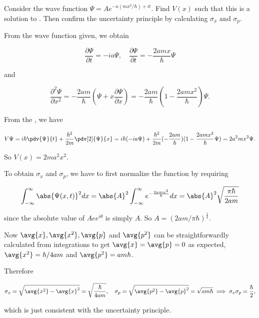 \documentclass[a4paper,12pt]{report}
\begin{document}
{Consider the wave function \(\Psi = Ae^{-a(mx^2 / \hbar ) + it}\). Find \(V(x)\) such that this is a solution to \screq. Then confirm the uncertainty principle by calculating \(\sigma_x \text { and }  \sigma_p\).}
{From the wave function given, we obtain
			
\begin{equation}
  \frac{\partial \Psi }{\partial t} = -ia\Psi , \quad  \frac{\partial \Psi }{\partial t} = -\frac{2amx}{\hbar }\Psi    
\end{equation}

and
		
\begin{equation}
  \frac{\partial^2 \Psi }{\partial x^2} = -\frac{2am}{\hbar }(\Psi + x\frac{\partial \Psi }{\partial x} ) = -\frac{2am}{\hbar }(1-\frac{2amx^2 }{\hbar } )\Psi .  
\end{equation}
		
From the \screq, we have 
		
\begin{equation}
  V\Psi = i\hbar\pdv{\Psi}{t} + \frac{\hbar^2}{2m}\pdv[2]{\Psi}{x} = i\hbar(-ia\Psi) + \frac{\hbar^2}{2m}(-\frac{2am}{\hbar})(1-\frac{2amx^2}{\hbar}\Psi) = 2a^2mx^2\Psi.
\end{equation}
		
		
So \(V(x) = 2ma^2x^2\).
		
To obtain \(\sigma_x\) and \(\sigma_p\), we have to first normalize the function by requiring

\begin{equation}
  \int_{-\infty}^{\infty} \abs{\Psi (x,t)}^2 dx = \abs{A} ^2  \int_{-\infty}^{\infty} e^{-\frac{2amx^2 }{\hbar } } dx = \abs{A} ^2 \sqrt{\frac{\pi \hbar }{2am} }     
\end{equation}

since the absolute value of \(Aee^{i \theta }\) is simply \(A\). So \( A = (2am /\pi \hbar )^{\frac{1}{4} }\).
		
Now \(\avg{x}, \avg{x^2}, \avg{p}\) and \(\avg{p^2}\) can be straightforwardly calculated from integrations to get \(\avg{x} = \avg{p} = 0\) as expected, \(\avg{x^2} = \hbar / 4am\) and \(\avg{p^2} = am\hbar\).
		
Therefore 

\begin{equation}
  \sigma_x = \sqrt{\avg{x^2} - \avg{x}^2} = \sqrt{\frac{\hbar}{4am}}, \quad \sigma _{p} = \sqrt{\avg{p^2}-\avg{p}^2  } = \sqrt{am \hbar } \implies \sigma _{x}\sigma _{p} = \frac{\hbar }{2},       
\end{equation}

which is just consistent with the uncertainty principle.}
\end{document}

